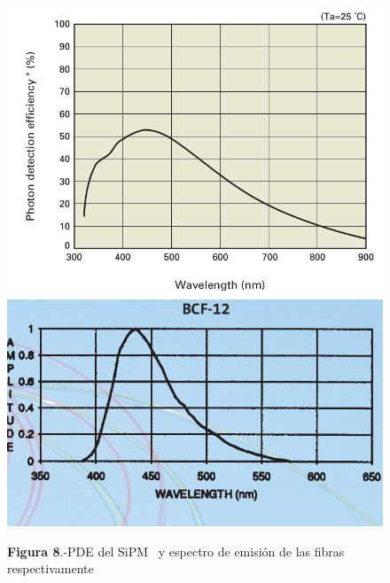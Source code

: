 \begin{figure}[htb]
\centering
{
\includegraphics[scale=0.3]{PED.png} 
}
{
\includegraphics[scale=0.35]{EmisionBCF12.png} 
}
\caption{\textbf{Figura 8}.-PDE del SiPM~\cite{datasheet SiPM} y espectro de emisión de las fibras~\cite{datasheet} respectivamente}
\end{figure}

